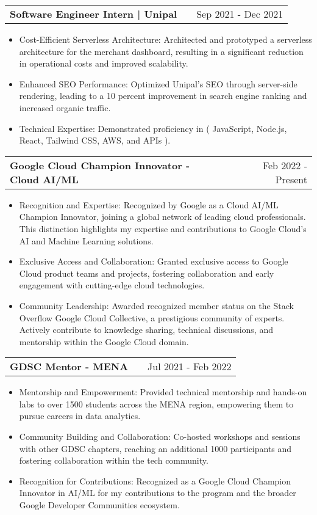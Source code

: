 \documentclass[a4paper,11pt]{article}
\makeatletter
\newenvironment{joblong}[2]
    {
    \begin{tabularx}{\linewidth}{@{}l X r@{}}
    \textbf{#1} & \hfill &  #2 \\[3.75pt]
    \end{tabularx}
    \begin{minipage}[t]{\linewidth}
    \begin{itemize}[nosep,after=\strut, leftmargin=1em, itemsep=3pt,label=--]
    }
    {
    \end{itemize}
    \end{minipage}    
    }
\makeatother
\begin{document}
\begin{joblong}{Software Engineer Intern | Unipal}{Sep 2021 - Dec 2021}
    \item Cost-Efficient Serverless Architecture: Architected and prototyped a serverless architecture for the merchant dashboard, resulting in a significant reduction in operational costs and improved scalability.
    \item Enhanced SEO Performance: Optimized Unipal's SEO through server-side rendering, leading to a 10 percent improvement in search engine ranking and increased organic traffic.
    \item Technical Expertise: Demonstrated proficiency in ( JavaScript, Node.js, React, Tailwind CSS, AWS, and APIs ).

\end{joblong}

\begin{joblong}{Google Cloud Champion Innovator - Cloud AI/ML}{Feb 2022 - Present}
\item Recognition and Expertise: Recognized by Google as a Cloud AI/ML Champion Innovator, joining a global network of leading cloud professionals. This distinction highlights my expertise and contributions to Google Cloud's AI and Machine Learning solutions.
\item Exclusive Access and Collaboration: Granted exclusive access to Google Cloud product teams and projects, fostering collaboration and early engagement with cutting-edge cloud technologies.
\item Community Leadership: Awarded recognized member status on the Stack Overflow Google Cloud Collective, a prestigious community of experts. Actively contribute to knowledge sharing, technical discussions, and mentorship within the Google Cloud domain.

\end{joblong}

\begin{joblong}{GDSC Mentor - MENA}{Jul 2021 - Feb 2022}
\item Mentorship and Empowerment: Provided technical mentorship and hands-on labs to over 1500 students across the MENA region, empowering them to pursue careers in data analytics.
\item Community Building and Collaboration: Co-hosted workshops and sessions with other GDSC chapters, reaching an additional 1000 participants and fostering collaboration within the tech community.
\item Recognition for Contributions: Recognized as a Google Cloud Champion Innovator in AI/ML for my contributions to the program and the broader Google Developer Communities ecosystem.

\end{joblong}
\end{document}
